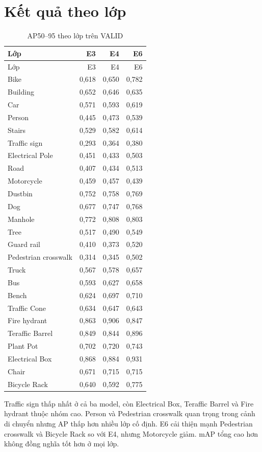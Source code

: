 \section{Kết quả theo lớp}
\begin{longtable}{lrrr}
\caption{AP50--95 theo lớp trên VALID}\label{tab:perclass}\\
\toprule Lớp & E3 & E4 & E6\\\midrule\endfirsthead
\toprule Lớp & E3 & E4 & E6\\\midrule\endhead
Bike & 0,618 & 0,650 & 0,782\\ Building & 0,652 & 0,646 & 0,635\\
Car & 0,571 & 0,593 & 0,619\\ Person & 0,445 & 0,473 & 0,539\\
Stairs & 0,529 & 0,582 & 0,614\\ Traffic sign & 0,293 & 0,364 & 0,380\\
Electrical Pole & 0,451 & 0,433 & 0,503\\ Road & 0,407 & 0,434 & 0,513\\
Motorcycle & 0,459 & 0,457 & 0,439\\ Dustbin & 0,752 & 0,758 & 0,769\\
Dog & 0,677 & 0,747 & 0,768\\ Manhole & 0,772 & 0,808 & 0,803\\
Tree & 0,517 & 0,490 & 0,549\\ Guard rail & 0,410 & 0,373 & 0,520\\
Pedestrian crosswalk & 0,314 & 0,345 & 0,502\\ Truck & 0,567 & 0,578 & 0,657\\
Bus & 0,593 & 0,627 & 0,658\\ Bench & 0,624 & 0,697 & 0,710\\
Traffic Cone & 0,634 & 0,647 & 0,643\\ Fire hydrant & 0,863 & 0,906 & 0,847\\
Teraffic Barrel & 0,849 & 0,844 & 0,896\\ Plant Pot & 0,702 & 0,720 & 0,743\\
Electrical Box & 0,868 & 0,884 & 0,931\\ Chair & 0,671 & 0,715 & 0,715\\
Bicycle Rack & 0,640 & 0,592 & 0,775\\\bottomrule
\end{longtable}

Traffic sign thấp nhất ở cả ba model, còn Electrical Box, Teraffic Barrel và Fire hydrant thuộc nhóm cao. Person và Pedestrian crosswalk quan trọng trong cảnh di chuyển nhưng AP thấp hơn nhiều lớp cố định. E6 cải thiện mạnh Pedestrian crosswalk và Bicycle Rack so với E4, nhưng Motorcycle giảm. mAP tổng cao hơn không đồng nghĩa tốt hơn ở mọi lớp.

